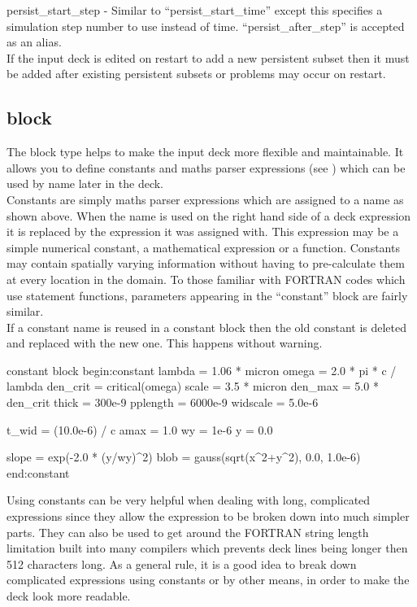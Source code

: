 {\emphtext persist\_start\_step} - Similar to ``persist\_start\_time'' except
  this specifies a simulation step number to use instead of time.
  ``persist\_after\_step'' is accepted as an alias.\\

If the input deck is edited on restart to add a new persistent subset then it
must be added after existing persistent subsets or problems may occur on
restart.


\subsection{\texorpdfstring
  { block}
  {           {constant} block}}
\label{sec:constant_block}

The  block type helps to make the input deck more flexible
and maintainable. It allows you to define constants and maths parser
expressions (see ) which can be used by name later in the
deck.\\

Constants are simply maths parser expressions which are assigned to a name as
shown above. When the name is used on the right hand side of a deck expression
it is replaced by the expression it was assigned with. This expression may
be a simple numerical constant, a mathematical expression or a function.
Constants may contain spatially varying information without having to
pre-calculate them at every location in the domain.
To those familiar with FORTRAN codes which use statement functions, parameters
appearing in the ``constant'' block are fairly similar.\\

If a constant name is reused in a constant block then the old constant is
deleted and replaced with the new one. This happens without warning.
\begin{lboxverbatim}{constant block}
begin:constant
   lambda = 1.06 * micron
   omega = 2.0 * pi * c / lambda
   den_crit = critical(omega)
   scale = 3.5 * micron
   den_max = 5.0 * den_crit
   thick = 300e-9
   pplength = 6000e-9
   widscale = 5.0e-6

   t_wid = (10.0e-6) / c
   amax = 1.0
   wy = 1e-6
   y = 0.0

   slope = exp(-2.0 * (y/wy)^2)
   blob = gauss(sqrt(x^2+y^2), 0.0, 1.0e-6)
end:constant
\end{lboxverbatim}

Using constants can be very helpful when dealing with long,
complicated expressions since they allow the expression to be broken down into
much simpler parts. They can also be used to get around the FORTRAN string
length limitation built into many compilers which prevents deck lines being
longer then 512 characters long. As a general rule, it is a good idea to break
down complicated expressions using constants or by other means, in order to
make the deck look more readable.\\

